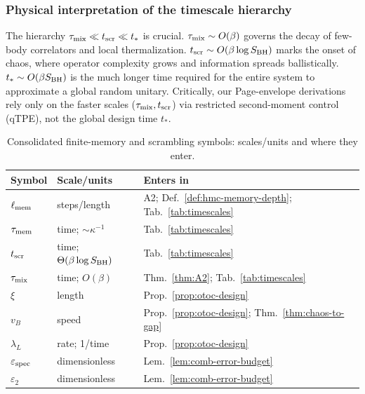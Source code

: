 \documentclass[11pt,a4paper]{article}
\theoremstyle{plain}
\theoremstyle{definition}
\theoremstyle{remark}
\begin{document}
\subsubsection{Physical interpretation of the timescale hierarchy}
The hierarchy $\tau_{\rm mix} \ll t_{\rm scr} \ll t_*$ is crucial. $\tau_{\rm mix} \sim O(\beta)$ governs the decay of few-body correlators and local thermalization. $t_{\rm scr} \sim O(\beta \log S_{\rm BH})$ marks the onset of chaos, where operator complexity grows and information spreads ballistically. $t_* \sim O(\beta S_{\rm BH})$ is the much longer time required for the entire system to approximate a global random unitary. Critically, our Page-envelope derivations rely only on the faster scales ($\tau_{\rm mix}, t_{\rm scr}$) via restricted second-moment control (qTPE), not the global design time $t_*$.



\begin{table}[t]
  \centering
  \caption{Consolidated finite-memory and scrambling symbols: scales/units and where they enter.}
  \label{tab:notation_consolidated}
  \small
  \begin{tabular*}{\textwidth}{@{\extracolsep{\fill}}lll@{}}
    \toprule
    \textbf{Symbol} & \textbf{Scale/units} & \textbf{Enters in} \\
    \midrule
    $\ell_{\rm mem}$ & steps/length & A2; Def.~\ref{def:hmc-memory-depth}; Tab.~\ref{tab:timescales} \\
    $\tau_{\rm mem}$ & time; $\sim \kappa^{-1}$ & Tab.~\ref{tab:timescales} \\
    $t_{\rm scr}$ & time; $\Theta(\beta\log S_{\rm BH})$ & Tab.~\ref{tab:timescales} \\
    $\tau_{\rm mix}$ & time; $O(\beta)$ & Thm.~\ref{thm:A2}; Tab.~\ref{tab:timescales} \\
    $\xi$ & length & Prop.~\ref{prop:otoc-design} \\
    $v_B$ & speed & Prop.~\ref{prop:otoc-design}; Thm.~\ref{thm:chaos-to-gap} \\
    $\lambda_L$ & rate; 1/time & Prop.~\ref{prop:otoc-design} \\
    $\varepsilon_{\rm spec}$ & dimensionless & Lem.~\ref{lem:comb-error-budget} \\
    $\varepsilon_2$ & dimensionless & Lem.~\ref{lem:comb-error-budget} \\
    \bottomrule
  \end{tabular*}
\end{table}
\end{document}
